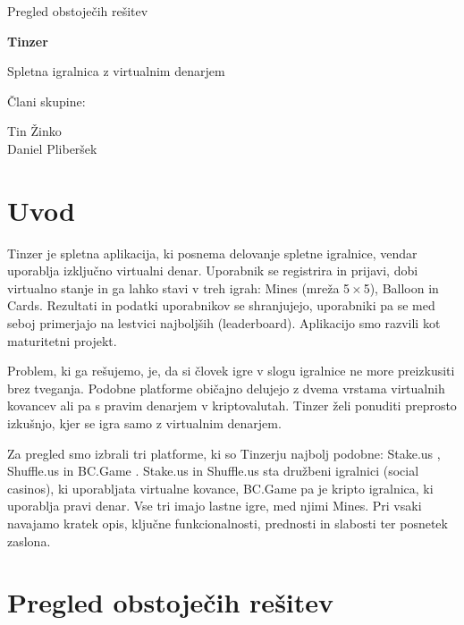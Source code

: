\documentclass[a4paper,12pt]{article}
\begin{document}
\begin{titlepage}
\centering
\vspace*{3cm}
{\Large Pregled obstoječih rešitev\par}
\vspace{1cm}
{\Huge\bfseries Tinzer\par}
\vspace{0.5cm}
{\large Spletna igralnica z virtualnim denarjem\par}
\vspace{3cm}
{\large Člani skupine:\par}
\vspace{0.4cm}
{\large Tin Žinko\\ Daniel Pliberšek\par}
\vfill

\end{titlepage}

\section{Uvod}
Tinzer je spletna aplikacija, ki posnema delovanje spletne igralnice, vendar uporablja izključno virtualni denar. Uporabnik se registrira in prijavi, dobi virtualno stanje in ga lahko stavi v treh igrah: Mines (mreža 5\,$\times$\,5), Balloon in Cards. Rezultati in podatki uporabnikov se shranjujejo, uporabniki pa se med seboj primerjajo na lestvici najboljših (leaderboard). Aplikacijo smo razvili kot maturitetni projekt.

Problem, ki ga rešujemo, je, da si človek igre v slogu igralnice ne more preizkusiti brez tveganja. Podobne platforme običajno delujejo z dvema vrstama virtualnih kovancev ali pa s pravim denarjem v kriptovalutah. Tinzer želi ponuditi preprosto izkušnjo, kjer se igra samo z virtualnim denarjem.

Za pregled smo izbrali tri platforme, ki so Tinzerju najbolj podobne: Stake.us \cite{stakeus}, Shuffle.us \cite{shuffleus} in BC.Game \cite{bcgame}. Stake.us in Shuffle.us sta družbeni igralnici (social casinos), ki uporabljata virtualne kovance, BC.Game pa je kripto igralnica, ki uporablja pravi denar. Vse tri imajo lastne igre, med njimi Mines. Pri vsaki navajamo kratek opis, ključne funkcionalnosti, prednosti in slabosti ter posnetek zaslona.

\section{Pregled obstoječih rešitev}
\end{document}
